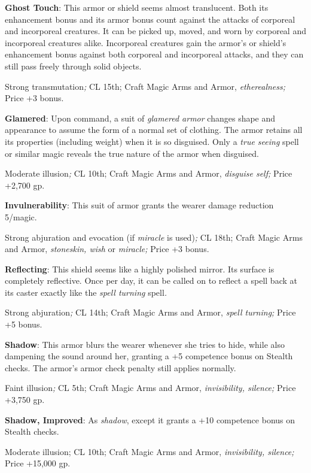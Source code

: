 \textbf{Ghost Touch}: This armor or shield seems almost translucent. Both its enhancement bonus and its armor bonus count against the attacks of corporeal and incorporeal creatures. It can be picked up, moved, and worn by corporeal and incorporeal creatures alike. Incorporeal creatures gain the armor's or shield's enhancement bonus against both corporeal and incorporeal attacks, and they can still pass freely through solid objects.
				
Strong transmutation\textit{; }CL 15th; Craft Magic Arms and Armor, \textit{etherealness; }Price +3 bonus.
				
\textbf{Glamered}: Upon command, a suit of \textit{glamered armor} changes shape and appearance to assume the form of a normal set of clothing. The armor retains all its properties (including weight) when it is so disguised. Only a \textit{true seeing }spell or similar magic reveals the true nature of the armor when disguised.
				
Moderate illusion\textit{; }CL 10th; Craft Magic Arms and Armor, \textit{disguise self; }Price +2,700 gp.
				
\textbf{Invulnerability}: This suit of armor grants the wearer damage reduction 5/magic.
				
Strong abjuration and evocation (if \textit{miracle }is used)\textit{; }CL 18th; Craft Magic Arms and Armor, \textit{stoneskin, wish }or \textit{miracle; }Price +3 bonus.
				
\textbf{Reflecting}: This shield seems like a highly polished mirror. Its surface is completely reflective. Once per day, it can be called on to reflect a spell back at its caster exactly like the \textit{spell turning }spell\textit{.}
				
Strong abjuration\textit{; }CL 14th; Craft Magic Arms and Armor, \textit{spell turning; }Price +5 bonus.
				
\textbf{Shadow}: This armor blurs the wearer whenever she tries to hide, while also dampening the sound around her, granting a +5 competence bonus on Stealth checks. The armor's armor check penalty still applies normally.
				
Faint illusion\textit{; }CL 5th; Craft Magic Arms and Armor, \textit{invisibility, silence; }Price +3,750 gp.
				
\textbf{Shadow, Improved}: As \textit{shadow}, except it grants a +10 competence bonus on Stealth checks.
				
Moderate illusion; CL 10th; Craft Magic Arms and Armor, \textit{invisibility, silence; }Price +15,000 gp.
				

